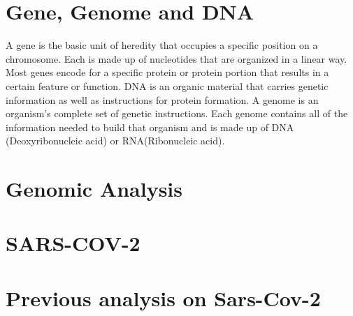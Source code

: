 \section{Gene, Genome and DNA}
A gene is the basic unit of heredity that occupies a specific position on a chromosome. Each is made up of nucleotides that are organized in a linear way. Most genes encode for a specific protein or protein portion that results in a certain feature or function. DNA is an organic material that carries genetic information as well as instructions for protein formation. A genome is an organism's complete set of genetic instructions. Each genome contains all of the information needed to build that organism and is made up of DNA (Deoxyribonucleic acid) or RNA(Ribonucleic acid). 

\section{Genomic Analysis}
\section{SARS-COV-2}
\section{Previous analysis on Sars-Cov-2}
